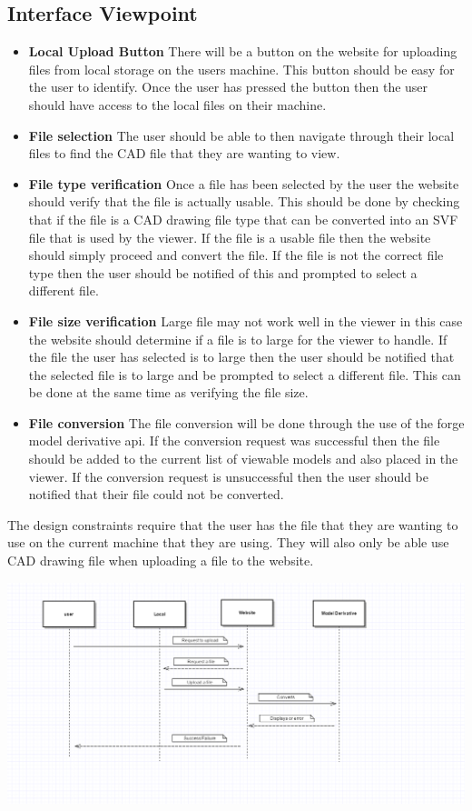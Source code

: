 \documentclass[letterpaper, 10pt, draftclsnofoot, compsoc, onecolumn]{IEEEtran}
\begin{document}
\subsection{Interface Viewpoint}
\begin{itemize}
	\item[]\textbf{Local Upload Button} There will be a button on the website for uploading files from local storage on the users machine. This button should be easy for the user to identify. Once the user has pressed the button then the user should have access to the local files on their machine.
	\item[]\textbf{File selection} The user should be able to then navigate through their local files to find the CAD file that they are wanting to view.
	\item[]\textbf{File type verification} Once a file has been selected by the user the website should verify that the file is actually usable. This should be done by checking that if the file is a CAD drawing file type that can be converted into an SVF file that is used by the viewer. If the file is a usable file then the website 			should simply proceed and convert the file. If the file is not the correct file type then the user should be notified of this and prompted to select a different file.  
	\item[]\textbf{File size verification} Large file may not work well in the viewer in this case the website should determine if a file is to large for the viewer to handle. If the file the user has selected is to large then the user should be notified that the selected file is to large and be prompted to select a different file.
	This can be done at the same time as verifying the file size.
	\item[]\textbf{File conversion} The file conversion will be done through the use of the forge model derivative api. If the conversion request was successful then the file should be added to the current list of viewable models and also placed in the viewer. If the conversion request is unsuccessful then the user should
	 be notified that their file could not be converted. 
\end{itemize}

The design constraints require that the user has the file that they are wanting to use on the current machine that they are using. They will also only be able use CAD drawing file when uploading a file to the website.  

\begin{flushleft}
	\includegraphics[scale=0.6]{localUpload.png}
\end{flushleft}
\end{document}
